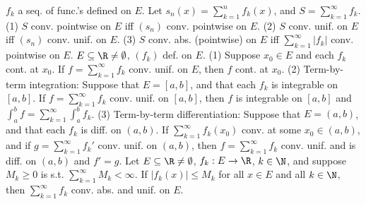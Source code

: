  $f_k$ a seq. of func.'s defined on $E$.
Let $s_n(x) = \sum_{k=1}^n f_k(x)$, and $S = \sum_{k=1}^\infty f_k$.
(1) $S$ conv. pointwise on $E$ iff $(s_n)$ conv. pointwise on $E$.
(2) $S$ conv. unif. on $E$ iff $(s_n)$ conv. unif. on $E$.
(3) $S$ conv. abs. (pointwise) on $E$ iff $\sum_{k=1}^\infty |f_k|$ conv. pointwise on $E$.
 $E \subseteq \R \neq \emptyset$, $(f_k)$ def. on $E$.
(1) Suppose $x_0 \in E$ and each $f_k$ cont. at $x_0$.
If $f = \sum_{k=1}^\infty f_k$ conv. unif. on $E$, then $f$ cont. at $x_0$.
(2) Term-by-term integration: Suppose that $E = [a,b]$, and that each $f_k$ is integrable on $[a,b]$.
If $f = \sum_{k=1}^\infty f_k$ conv. unif. on $[a,b]$, then $f$ is integrable on $[a,b]$ and
$\int_a^b f = \sum_{k=1}^\infty \int_a^b f_k$.
(3) Term-by-term differentiation: Suppose that $E = (a,b)$, and that each $f_k$ is diff. on $(a,b)$.
If $\sum_{k=1}^\infty f_k(x_0)$ conv. at some $x_0 \in (a,b)$, and if
$g = \sum_{k=1}^\infty f_k'$ conv. unif. on $(a,b)$,
then $f = \sum_{k=1}^\infty f_k$ conv. unif. and is diff. on $(a,b)$ and $f' = g$.
Let $E \subseteq \R \neq \emptyset$, $f_k: E \to \R$, $k \in \N$,
and suppose $M_k \ge 0$ is s.t. $\sum_{k=1}^\infty M_k < \infty$.
If $|f_k(x)| \le M_k$ for all $x \in E$ and all $k \in \N$, then
$\sum_{k=1}^\infty f_k$ conv. abs. and unif. on $E$.
